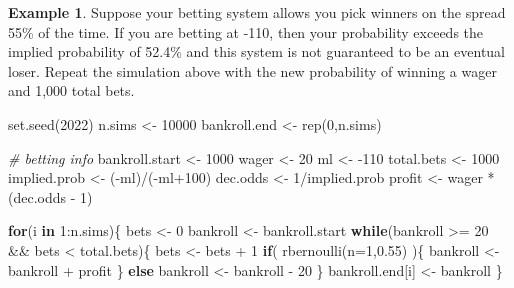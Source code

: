 \documentclass[
  11pt,
]{book}
\newenvironment{Shaded}{\begin{snugshade}}{\end{snugshade}}
\newcommand{\AttributeTok}[1]{\textcolor[rgb]{0.77,0.63,0.00}{#1}}
\newcommand{\CommentTok}[1]{\textcolor[rgb]{0.56,0.35,0.01}{\textit{#1}}}
\newcommand{\ControlFlowTok}[1]{\textcolor[rgb]{0.13,0.29,0.53}{\textbf{#1}}}
\newcommand{\DecValTok}[1]{\textcolor[rgb]{0.00,0.00,0.81}{#1}}
\newcommand{\FloatTok}[1]{\textcolor[rgb]{0.00,0.00,0.81}{#1}}
\newcommand{\FunctionTok}[1]{\textcolor[rgb]{0.00,0.00,0.00}{#1}}
\newcommand{\NormalTok}[1]{#1}
\newcommand{\OtherTok}[1]{\textcolor[rgb]{0.56,0.35,0.01}{#1}}
\newcommand{\SpecialCharTok}[1]{\textcolor[rgb]{0.00,0.00,0.00}{#1}}
\theoremstyle{definition}
\theoremstyle{definition}
\newtheorem{example}{Example}[chapter]
\theoremstyle{definition}
\theoremstyle{definition}
\theoremstyle{remark}
\begin{document}
\begin{example}
Suppose your betting system allows you pick winners on the spread 55\% of the time. If you are betting at -110, then your probability exceeds the implied probability of 52.4\% and this system is not guaranteed to be an eventual loser. Repeat the simulation above with the new probability of winning a wager and 1,000 total bets.
\end{example}

\begin{Shaded}
\begin{Highlighting}[]
\FunctionTok{set.seed}\NormalTok{(}\DecValTok{2022}\NormalTok{)}
\NormalTok{n.sims }\OtherTok{\textless{}{-}} \DecValTok{10000}
\NormalTok{bankroll.end }\OtherTok{\textless{}{-}} \FunctionTok{rep}\NormalTok{(}\DecValTok{0}\NormalTok{,n.sims)}

\CommentTok{\# betting info}
\NormalTok{bankroll.start }\OtherTok{\textless{}{-}} \DecValTok{1000}
\NormalTok{wager }\OtherTok{\textless{}{-}} \DecValTok{20}
\NormalTok{ml }\OtherTok{\textless{}{-}} \SpecialCharTok{{-}}\DecValTok{110}
\NormalTok{total.bets }\OtherTok{\textless{}{-}} \DecValTok{1000}
\NormalTok{implied.prob }\OtherTok{\textless{}{-}}\NormalTok{ (}\SpecialCharTok{{-}}\NormalTok{ml)}\SpecialCharTok{/}\NormalTok{(}\SpecialCharTok{{-}}\NormalTok{ml}\SpecialCharTok{+}\DecValTok{100}\NormalTok{)}
\NormalTok{dec.odds }\OtherTok{\textless{}{-}} \DecValTok{1}\SpecialCharTok{/}\NormalTok{implied.prob}
\NormalTok{profit }\OtherTok{\textless{}{-}}\NormalTok{ wager }\SpecialCharTok{*}\NormalTok{ (dec.odds }\SpecialCharTok{{-}} \DecValTok{1}\NormalTok{)}

\ControlFlowTok{for}\NormalTok{(i }\ControlFlowTok{in} \DecValTok{1}\SpecialCharTok{:}\NormalTok{n.sims)\{}
\NormalTok{  bets }\OtherTok{\textless{}{-}} \DecValTok{0}
\NormalTok{  bankroll }\OtherTok{\textless{}{-}}\NormalTok{ bankroll.start}
  \ControlFlowTok{while}\NormalTok{(bankroll }\SpecialCharTok{\textgreater{}=} \DecValTok{20} \SpecialCharTok{\&\&}\NormalTok{ bets }\SpecialCharTok{\textless{}}\NormalTok{ total.bets)\{}
\NormalTok{    bets }\OtherTok{\textless{}{-}}\NormalTok{ bets }\SpecialCharTok{+} \DecValTok{1}
    \ControlFlowTok{if}\NormalTok{( }\FunctionTok{rbernoulli}\NormalTok{(}\AttributeTok{n=}\DecValTok{1}\NormalTok{,}\FloatTok{0.55}\NormalTok{) )\{}
\NormalTok{      bankroll }\OtherTok{\textless{}{-}}\NormalTok{ bankroll }\SpecialCharTok{+}\NormalTok{ profit}
\NormalTok{    \} }\ControlFlowTok{else}
\NormalTok{      bankroll }\OtherTok{\textless{}{-}}\NormalTok{ bankroll }\SpecialCharTok{{-}} \DecValTok{20}
\NormalTok{  \}}
\NormalTok{  bankroll.end[i] }\OtherTok{\textless{}{-}}\NormalTok{ bankroll}
\NormalTok{\}}


\end{Highlighting}
\end{Shaded}
\end{document}
